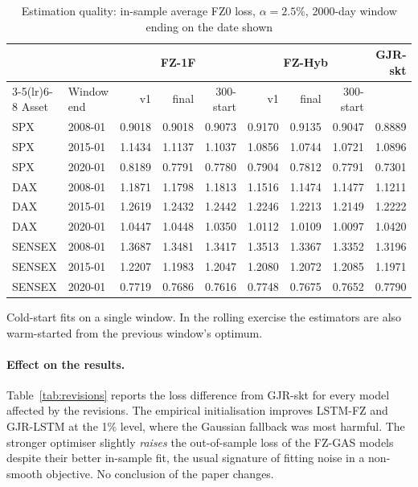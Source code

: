 \begin{table}[htbp]\centering\footnotesize
\caption{Estimation quality: in-sample average FZ0 loss, $\alpha=2.5\%$, 2000-day window ending on the date shown}\label{tab:estdiag}
\begin{tabular}{llrrrrrrr}\toprule
& & \multicolumn{3}{c}{FZ-1F} & \multicolumn{3}{c}{FZ-Hyb} & GJR-skt \\
\cmidrule(lr){3-5}\cmidrule(lr){6-8}
Asset & Window end & v1 & final & 300-start & v1 & final & 300-start & \\ \midrule
SPX & 2008-01 & 0.9018 & 0.9018 & 0.9073 & 0.9170 & 0.9135 & 0.9047 & 0.8889 \\
SPX & 2015-01 & 1.1434 & 1.1137 & 1.1037 & 1.0856 & 1.0744 & 1.0721 & 1.0896 \\
SPX & 2020-01 & 0.8189 & 0.7791 & 0.7780 & 0.7904 & 0.7812 & 0.7791 & 0.7301 \\
DAX & 2008-01 & 1.1871 & 1.1798 & 1.1813 & 1.1516 & 1.1474 & 1.1477 & 1.1211 \\
DAX & 2015-01 & 1.2619 & 1.2432 & 1.2442 & 1.2246 & 1.2213 & 1.2149 & 1.2222 \\
DAX & 2020-01 & 1.0447 & 1.0448 & 1.0350 & 1.0112 & 1.0109 & 1.0097 & 1.0420 \\
SENSEX & 2008-01 & 1.3687 & 1.3481 & 1.3417 & 1.3513 & 1.3367 & 1.3352 & 1.3196 \\
SENSEX & 2015-01 & 1.2207 & 1.1983 & 1.2047 & 1.2080 & 1.2072 & 1.2085 & 1.1971 \\
SENSEX & 2020-01 & 0.7719 & 0.7686 & 0.7616 & 0.7748 & 0.7675 & 0.7652 & 0.7790 \\
\bottomrule\end{tabular}
\par\smallskip\parbox{\linewidth}{\scriptsize Cold-start fits on a single window. In the rolling exercise the estimators are also warm-started from the previous window's optimum.}
\end{table}

\paragraph{Effect on the results.} Table~\ref{tab:revisions} reports the loss difference from GJR-skt for every model affected by the revisions. The empirical initialisation improves LSTM-FZ and GJR-LSTM at the 1\% level, where the Gaussian fallback was most harmful. The stronger optimiser slightly \emph{raises} the out-of-sample loss of the FZ-GAS models despite their better in-sample fit, the usual signature of fitting noise in a non-smooth objective. No conclusion of the paper changes.


